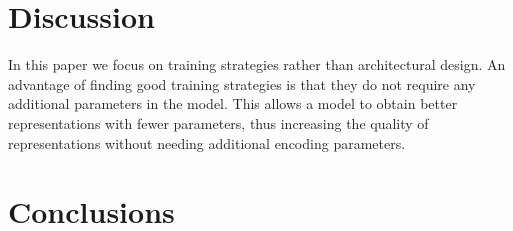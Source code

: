 \documentclass[11pt,a4paper]{article}
\begin{document}
\section{Discussion}

In this paper we focus on training strategies rather than
architectural design. An advantage of finding good training strategies
is that they do not require any additional parameters in the
model. This allows a model to obtain better representations with fewer
parameters, thus increasing the quality of representations without
needing additional encoding parameters.  

\section{Conclusions}



 



\end{document}
